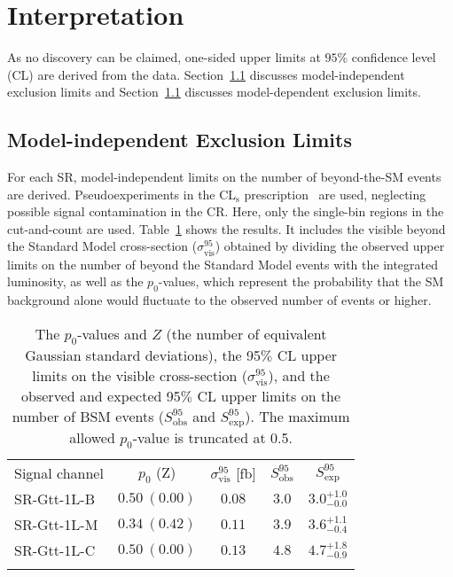 
\section{Interpretation}\label{mbinter}

As no discovery can be claimed, one-sided upper limits at $95\%$ confidence
level (CL) are derived from the data. Section~\ref{mb:midel} discusses
model-independent exclusion limits and Section~\ref{mb:midel} discusses
model-dependent exclusion limits.


\subsection{Model-independent Exclusion Limits}\label{mb:midel}

For each SR, model-independent limits on the number of beyond-the-SM events are
derived. Pseudoexperiments in the CL$_{\text{s}}$
prescription~\cite{Read:2002hq} are used, neglecting possible signal
contamination in the CR. Here, only the single-bin regions in the cut-and-count
are used. Table~\ref{mod-ind-lim} shows the results. It includes the visible
beyond the Standard Model cross-section ($\sigma_{\text{vis}}^{95}$) obtained
by dividing the observed upper limits on the number of beyond the Standard
Model events with the integrated luminosity, as well as the $p_0$-values, which
represent the probability that the SM background alone would fluctuate to the
observed number of events or higher.

\begin{table}[H]
	\centering
	\small
	\begin{tabular*}{0.6\textwidth}{@{\extracolsep{\fill}}lcccc}
		\noalign{\smallskip}\toprule\noalign{\smallskip}
		Signal channel         & $p_0$ (Z)            & $\sigma^{95}_{\text{vis}}$ [fb]  &  $S_{\text{obs}}^{95}$  & $S_{\text{exp}}^{95}$   \\
		\noalign{\smallskip}\midrule \noalign{\smallskip}
		SR-Gtt-1L-B & $ 0.50~(0.00) $ &  $0.08$ &  $3.0$ & $ { 3.0 }^{ +1.0 }_{ -0.0 }$ \\[1mm]
		SR-Gtt-1L-M & $ 0.34~(0.42)$ &  $0.11$ &  $3.9$ & $ { 3.6 }^{ +1.1 }_{ -0.4 }$ \\[1mm]
		SR-Gtt-1L-C & $ 0.50~(0.00)$ &  $0.13$ &  $4.8$ & $ { 4.7 }^{ +1.8 }_{ -0.9 }$ \\[1mm]
		\noalign{\smallskip}\midrule\noalign{\smallskip}
	\end{tabular*}
	\caption{The $p_0$-values and $Z$ (the number of equivalent Gaussian standard deviations),
	the 95$\%$ CL upper limits on the visible cross-section
	($\sigma^{95}_{\text{vis}}$),
	and the observed and
	expected 95$\%$ CL upper limits on the number of BSM events ($S_{\text{obs}}^{95}$
	and $S_{\text{exp}}^{95}$). The maximum
	allowed $p_0$-value
	is truncated at 0.5.}
	\label{mod-ind-lim}
\end{table}

